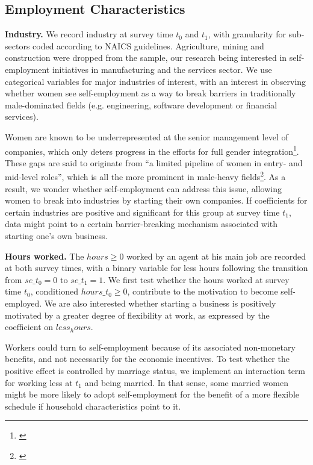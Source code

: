 \subsection{Employment Characteristics}

\textbf{Industry.} We record industry at survey time $t_0$ and $t_1$, with granularity for sub-sectors coded according to NAICS guidelines. Agriculture, mining and construction were dropped from the sample, our research being interested in self-employment initiatives in manufacturing and the services sector. We use categorical variables for major industries of interest, with an interest in observing whether women see self-employment as a way to break barriers in traditionally male-dominated fields (e.g. engineering, software development or financial services).

Women are known to be underrepresented at the senior management level of companies, which only deters progress in the efforts for full gender integration\footnote{\cite{olivetti2016dp11034}}. These gaps are said to originate from ``a limited pipeline of women in entry- and mid-level roles'', which is all the more prominent in male-heavy fields\footnote{\cite{adams2012beyond}}. As a result, we wonder whether self-employment can address this issue, allowing women to break into industries by starting their own companies. If coefficients for certain industries are positive and significant for this group at survey time $t_1$, data might point to a certain barrier-breaking mechanism associated with starting one's own business. 


\textbf{Hours worked.} The $hours \geq 0$ worked by an agent at his main job are recorded at both survey times, with a binary variable for less hours following the transition from $se\_t_0 = 0$ to $se\_t_1 = 1$. We first test whether the hours worked at survey time $t_0$, conditioned $hours\_t_0 \geq 0$, contribute to the motivation to become self-employed. We are also interested whether starting a business is positively motivated by a greater degree of flexibility at work, as expressed by the coefficient on $less_hours$. 

Workers could turn to self-employment because of its associated non-monetary benefits, and not necessarily for the economic incentives. To test whether the positive effect is controlled by marriage status, we implement an interaction term for working less at $t_1$ and being married. In that sense, some married women might be more likely to adopt self-employment for the benefit of a more flexible schedule if household characteristics point to it. 

